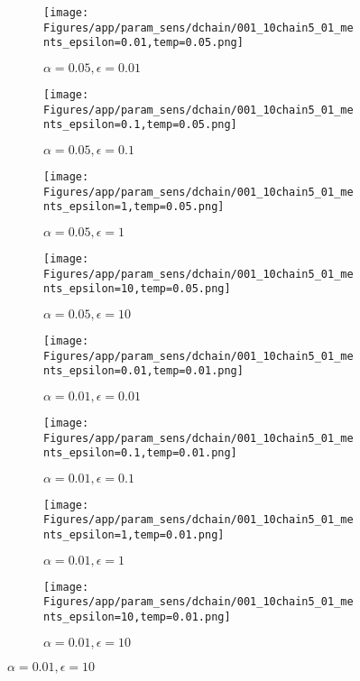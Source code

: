\documentclass{article}
\theoremstyle{plain}
\begin{document}
\begin{appendices}
\begin{figure}
                \begin{subfigure}[b]{0.24\textwidth}
                    \centering
                    \texttt{[image: Figures/app/param\_sens/dchain/001\_10chain5\_01\_ments\_epsilon=0.01,temp=0.05.png]}
                    \caption*{$\alpha=0.05,\epsilon=0.01$}
                \end{subfigure}
                \begin{subfigure}[b]{0.24\textwidth}
                    \centering
                    \texttt{[image: Figures/app/param\_sens/dchain/001\_10chain5\_01\_ments\_epsilon=0.1,temp=0.05.png]}
                    \caption*{$\alpha=0.05,\epsilon=0.1$}
                \end{subfigure}
                \begin{subfigure}[b]{0.24\textwidth}
                    \centering
                    \texttt{[image: Figures/app/param\_sens/dchain/001\_10chain5\_01\_ments\_epsilon=1,temp=0.05.png]}
                    \caption*{$\alpha=0.05,\epsilon=1$}
                \end{subfigure}
                \begin{subfigure}[b]{0.24\textwidth}
                    \centering
                    \texttt{[image: Figures/app/param\_sens/dchain/001\_10chain5\_01\_ments\_epsilon=10,temp=0.05.png]}
                    \caption*{$\alpha=0.05,\epsilon=10$}
                \end{subfigure}
                
                \begin{subfigure}[b]{0.24\textwidth}
                    \centering
                    \texttt{[image: Figures/app/param\_sens/dchain/001\_10chain5\_01\_ments\_epsilon=0.01,temp=0.01.png]}
                    \caption*{$\alpha=0.01,\epsilon=0.01$}
                \end{subfigure}
                \begin{subfigure}[b]{0.24\textwidth}
                    \centering
                    \texttt{[image: Figures/app/param\_sens/dchain/001\_10chain5\_01\_ments\_epsilon=0.1,temp=0.01.png]}
                    \caption*{$\alpha=0.01,\epsilon=0.1$}
                \end{subfigure}
                \begin{subfigure}[b]{0.24\textwidth}
                    \centering
                    \texttt{[image: Figures/app/param\_sens/dchain/001\_10chain5\_01\_ments\_epsilon=1,temp=0.01.png]}
                    \caption*{$\alpha=0.01,\epsilon=1$}
                \end{subfigure}
                \begin{subfigure}[b]{0.24\textwidth}
                    \centering
                    \texttt{[image: Figures/app/param\_sens/dchain/001\_10chain5\_01\_ments\_epsilon=10,temp=0.01.png]}
                    \caption*{$\alpha=0.01,\epsilon=10$}
                \end{subfigure}
                

\end{figure}
\end{appendices}
\end{document}
